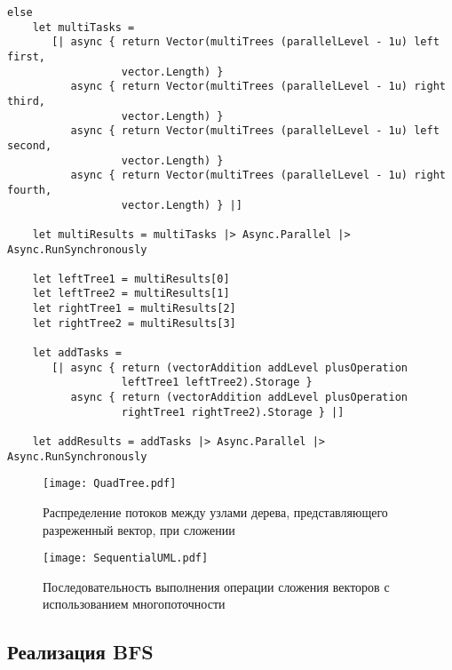 \begin{lstlisting}[style=fsharp, caption={Часть функции умножения вектора и матрицы, отвечающая за параллельную составляющую векторно-матричной операции.}, label={lst:multi},  frame=single, firstnumber=93]
else
    let multiTasks =
       [| async { return Vector(multiTrees (parallelLevel - 1u) left first,
                  vector.Length) }
          async { return Vector(multiTrees (parallelLevel - 1u) right third,
                  vector.Length) }
          async { return Vector(multiTrees (parallelLevel - 1u) left second,
                  vector.Length) }
          async { return Vector(multiTrees (parallelLevel - 1u) right fourth,
                  vector.Length) } |]

    let multiResults = multiTasks |> Async.Parallel |> Async.RunSynchronously

    let leftTree1 = multiResults[0]
    let leftTree2 = multiResults[1]
    let rightTree1 = multiResults[2]
    let rightTree2 = multiResults[3]

    let addTasks =
       [| async { return (vectorAddition addLevel plusOperation
                  leftTree1 leftTree2).Storage }
          async { return (vectorAddition addLevel plusOperation
                  rightTree1 rightTree2).Storage } |]

    let addResults = addTasks |> Async.Parallel |> Async.RunSynchronously

\end{lstlisting}

\begin{figure}
    \centering
    \texttt{[image: QuadTree.pdf]}
    \caption{Распределение потоков между узлами дерева, представляющего разреженный вектор, при сложении\\}
    \label{fig:tree}
    \texttt{[image: SequentialUML.pdf]}
    \caption{Последовательность выполнения операции сложения векторов с использованием многопоточности}
    \label{fig:uml}
\end{figure}

\subsection{Реализация BFS}

